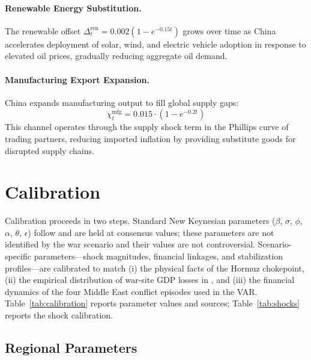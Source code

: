 \documentclass[12pt]{article}
\begin{document}
\paragraph{Renewable Energy Substitution.} The renewable offset $\Delta^{\text{ren}}_t = 0.002(1-e^{-0.15t})$ grows over time as China accelerates deployment of solar, wind, and electric vehicle adoption in response to elevated oil prices, gradually reducing aggregate oil demand.

\paragraph{Manufacturing Export Expansion.} China expands manufacturing output to fill global supply gaps:
\begin{equation}
\chi^{\text{mfg}}_t = 0.015 \cdot (1 - e^{-0.2t})
\label{eq:mfg}
\end{equation}
This channel operates through the supply shock term in the Phillips curve of trading partners, reducing imported inflation by providing substitute goods for disrupted supply chains.



\section{Calibration}
\label{sec:calibration}

Calibration proceeds in two steps. Standard New Keynesian parameters ($\beta$, $\sigma$, $\phi$, $\alpha$, $\theta$, $\epsilon$) follow \citet{gali2015monetary} and are held at consensus values; these parameters are not identified by the war scenario and their values are not controversial. Scenario-specific parameters---shock magnitudes, financial linkages, and stabilization profiles---are calibrated to match (i) the physical facts of the Hormuz chokepoint, (ii) the empirical distribution of war-site GDP losses in \citet{federle2026price}, and (iii) the financial dynamics of the four Middle East conflict episodes used in the VAR. Table~\ref{tab:calibration} reports parameter values and sources; Table~\ref{tab:shocks} reports the shock calibration.

\subsection{Regional Parameters}
\end{document}
